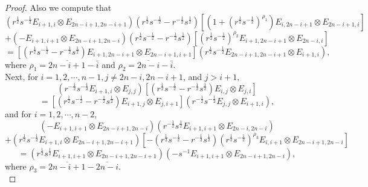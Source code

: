 \documentclass[10pt,a4paper]{amsart}
\begin{document}
\begin{proof}
Also we compute that
$$
\left(r^{\frac{1}{2}} s^{-\frac{1}{2}} E_{i+1, i} \otimes E_{2 n-i+1,2 n-i+1}\right)\left(r^{\frac{1}{2}} s^{-\frac{1}{2}}-r^{-\frac{1}{2}} s^{\frac{1}{2}}\right)\left[\left(1+\left(r^{\frac{1}{2}} s^{-\frac{1}{2}}\right)^{\rho_1}\right) E_{i, 2 n-i+1} \otimes E_{2 n-i+1, i}\right]
$$
$$
+\left(-E_{i+1, i+1} \otimes E_{2 n-i+1,2 n-i}\right)\left(r^{\frac{1}{2}} s^{-\frac{1}{2}}-r^{-\frac{1}{2}} s^{\frac{1}{2}}\right)\left[\left(r^{\frac{1}{2}} s^{-\frac{1}{2}}\right)^{\rho_2} E_{i+1,2 n-i+1} \otimes E_{2 n-i, i}\right]
$$
$$
=\left[\left(r^{\frac{1}{2}} s^{-\frac{1}{2}}-r^{-\frac{1}{2}} s^{\frac{1}{2}}\right) E_{i+1,2 n-i+1} \otimes E_{2 n-i+1, i+1}\right]\left(r^{\frac{1}{2}} s^{-\frac{1}{2}} E_{2 n-i+1,2 n-i+1} \otimes E_{i+1, i}\right),
$$
where $
\rho_1=\overline{2 n-i+1}-\bar{i}$ and $\rho_2=\overline{2 n-i}-\bar{i}.$\\

Next, for $i=1,2, \cdots ,n-1, j \neq 2 n-i, 2 n-i+1$, and $j>i+1,$
$$
\left(r^{-\frac{1}{2}} s^{-\frac{1}{2}} E_{i+1, i} \otimes E_{j, j}\right)\left[\left(r^{\frac{1}{2}} s^{-\frac{1}{2}}-r^{-\frac{1}{2}} s^{\frac{1}{2}}\right) E_{i, j} \otimes E_{j, i}\right]
$$
$$
=\left[\left(r^{\frac{1}{2}} s^{-\frac{1}{2}}-r^{-\frac{1}{2}} s^{\frac{1}{2}}\right) E_{i+1, j} \otimes E_{j, i+1}\right]\left(r^{-\frac{1}{2}} s^{-\frac{1}{2}} E_{j, j} \otimes E_{i+1, i}\right),
$$
and for $i=1,2, \cdots ,n-2$,
$$
\left(-E_{i+1, i+1} \otimes E_{2 n-i+1,2 n-i}\right)\left(r^{-\frac{1}{2}} s^{\frac{1}{2}} E_{i+1, i+1} \otimes E_{2 n-i, 2 n-i}\right)
$$
$$
+\left(r^{\frac{1}{2}} s^{-\frac{1}{2}} E_{i+1, i} \otimes E_{2 n-i+1,2 n-i+1}\right)\left[-\left(r^{\frac{1}{2}} s^{-\frac{1}{2}}-r^{-\frac{1}{2}} s^{\frac{1}{2}}\right)\left(r^{\frac{1}{2}} s^{-\frac{1}{2}}\right)^{\rho_3} E_{i, i+1} \otimes E_{2 n-i+1,2 n-i}\right]
$$
$$
=\left(r^{\frac{1}{2}} s^{\frac{1}{2}} E_{i+1, i+1} \otimes E_{2 n-i+1,2 n-i+1}\right)\left(-s^{-1} E_{i+1, i+1} \otimes E_{2 n-i+1,2 n-i}\right),
$$
where $\rho_3=\overline{2 n-i+1}-\overline{2 n-i}.$\\


\end{proof}
\end{document}
